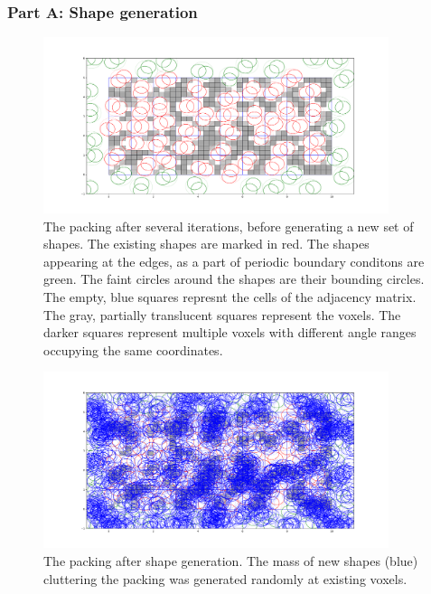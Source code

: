 \documentclass[12pt, oneside]{report}
\begin{document}
\subsubsection{Part A: Shape generation}

\begin{figure}[H]
  \centering
	\includegraphics[width=0.9\textwidth,keepaspectratio]{Images/GPURSA/Figure_1.pdf}
	\caption{The packing after several iterations, before generating a new set of shapes.\newline
	The existing shapes are marked in red. The shapes appearing at the edges, as a part of periodic boundary conditons are green. The faint circles around the shapes are their bounding circles. The empty, blue squares represnt the cells of the adjacency matrix. The gray, partially translucent squares represent the voxels. The darker squares represent multiple voxels with different angle ranges occupying the same coordinates.}
	\label{GPURSA_Process_1}
\end{figure}

\begin{figure}[H]
  \centering
	\includegraphics[width=0.9\textwidth,keepaspectratio]{Images/GPURSA/Figure_2.pdf}
	\caption{The packing after shape generation. The mass of new shapes (blue) cluttering the packing was generated randomly at existing voxels.}
	\label{GPURSA_Process_1}
\end{figure}
\end{document}
